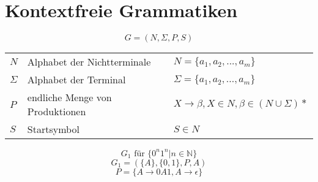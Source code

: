 
\section{Kontextfreie Grammatiken}
%

\[
G=(N,\Sigma,P,S)
\]
\begin{tabular}{lll}
	\(N\)		& Alphabet der Nichtterminale		& \(N = \{a_1,a_2,...,a_m\}\)\\
	\(\Sigma\)	& Alphabet der Terminal				& \(\Sigma = \{a_1,a_2,...,a_m\}\)\\
	\(P\)		& endliche Menge von Produktionen	& \(X \rightarrow \beta, X \in N, \beta \in (N \cup \Sigma)*\)\\
	\(S\)		& Startsymbol						& \(S \in N\)\\
\end{tabular}

\[
G_1  \text{ für } \{0^n1^n|n\in \mathbb{N}\}
\]
\[
G_1 = (\{A\},\{0,1\},P,A)
\]
\[
P=\{A\rightarrow0A1,A\rightarrow\epsilon\}
\]
